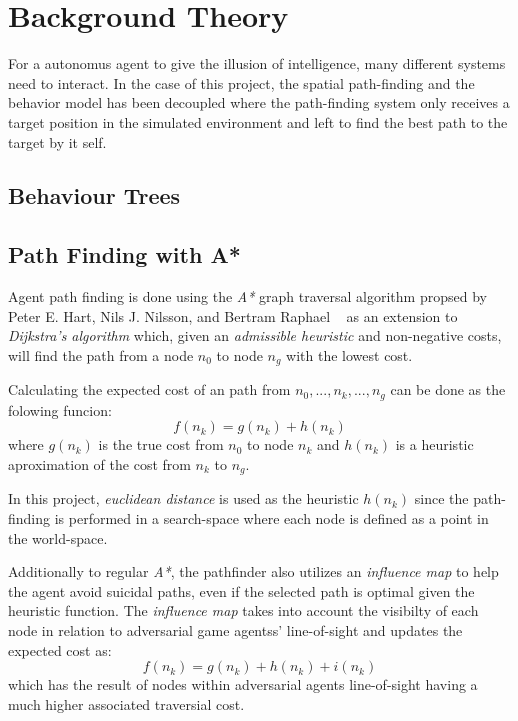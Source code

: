 \documentclass[a4paper, twocolumn]{article}
\begin{document}
    \section{Background Theory} \label{sec:background_theory}

	For a autonomus agent to give the illusion of intelligence, many different systems need to interact. In the case of this project, the spatial path-finding and the behavior model has been decoupled where the path-finding system only receives a target position in the simulated environment and left to find the best path to the target by it self.

        \subsection{Behaviour Trees} \label{sec:behaviour_trees}

	

        \subsection{Path Finding with A*} \label{sec:path_finding}

	Agent path finding is done using the \emph{A*} graph traversal algorithm propsed by Peter E. Hart, Nils J. Nilsson, and Bertram Raphael ~\cite{hart1968formal} as an extension to \emph{Dijkstra's algorithm} which, given an \emph{admissible heuristic} and non-negative costs, will find the path from a node \(n_0\) to node \(n_g\) with the lowest cost.
	
	Calculating the expected cost of an path from \(n_0,...,n_k,...,n_g\) can be done as the folowing funcion:
	\begin{equation*}
		f(n_k) = g(n_k) + h(n_k)
	\end{equation*}	
	where \(g(n_k)\) is the true cost from \(n_0\) to node \(n_k\) and \(h(n_k)\) is a heuristic aproximation of the cost from \(n_k\) to \(n_g\).

        In this project, \emph{euclidean distance} is used as the heuristic \(h(n_k)\) since the path-finding is performed in a search-space where each node is defined as a point in the world-space. 

	Additionally to regular \emph{A*}, the pathfinder also utilizes an \emph{influence map} to help the agent avoid suicidal paths, even if the selected path is optimal given the heuristic function. The \emph{influence map} takes into account the visibilty of each node in relation to adversarial game agentss' line-of-sight and updates the expected cost as:
	\begin{equation*}
		f(n_k) = g(n_k) + h(n_k) + i(n_k)
	\end{equation*} 
	which has the result of nodes within adversarial agents line-of-sight having a much higher associated traversial cost. 
	
\end{document}

